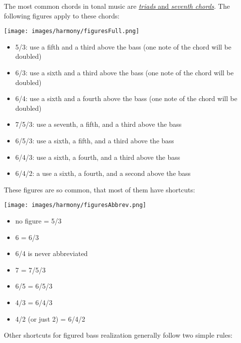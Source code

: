 \documentclass{book}
\providecommand{\tightlist}{%
  \setlength{\itemsep}{0pt}\setlength{\parskip}{0pt}}
\begin{document}
The most common chords in tonal music are \href{triads.html}{\emph{triads} and
\emph{seventh chords}}. The following figures apply to these chords:

\texttt{[image: images/harmony/figuresFull.png]}

\begin{itemize}
\tightlist
\item
  5/3: use a fifth and a third above the bass (one note of the chord will be
  doubled)\\
\item
  6/3: use a sixth and a third above the bass (one note of the chord will be
  doubled)\\
\item
  6/4: use a sixth and a fourth above the bass (one note of the chord will be
  doubled)\\
\item
  7/5/3: use a seventh, a fifth, and a third above the bass\\
\item
  6/5/3: use a sixth, a fifth, and a third above the bass\\
\item
  6/4/3: use a sixth, a fourth, and a third above the bass\\
\item
  6/4/2: a use a sixth, a fourth, and a second above the bass
\end{itemize}

These figures are so common, that most of them have shortcuts:

\texttt{[image: images/harmony/figuresAbbrev.png]}

\begin{itemize}
\tightlist
\item
  no figure = 5/3\\
\item
  6 = 6/3\\
\item
  6/4 is never abbreviated\\
\item
  7 = 7/5/3\\
\item
  6/5 = 6/5/3\\
\item
  4/3 = 6/4/3\\
\item
  4/2 (or just 2) = 6/4/2
\end{itemize}

Other shortcuts for figured bass realization generally follow two simple
rules:
\end{document}
